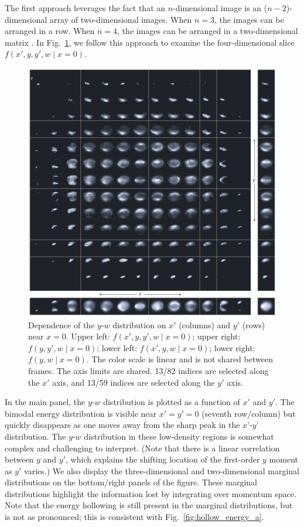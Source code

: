 \documentclass[%
 reprint,
 amsmath,amssymb,
 aps,
prstab,
]{revtex4-2}
\begin{document}
The first approach leverages the fact that an $n$-dimensional image is an ($n-2$)-dimensional array of two-dimensional images. When $n = 3$, the images can be arranged in a row. When $n = 4$, the images can be arranged in a two-dimensional matrix \cite{Ruisard2020}. In Fig.~\ref{fig:matrix_slice_xpyp_view_yw}, we follow this approach to examine the four-dimensional slice $f(x', y, y', w \mid x{=}0)$.
%
\begin{figure}[]
    \centering
    \includegraphics[width=\textwidth]{fig4.pdf}
    \caption{Dependence of the $y$-$w$ distribution on $x'$ (columns) and $y'$ (rows) near $x = 0$. Upper left: $f(x', y, y', w \mid x{=}0)$; upper right: $f(y, y', w \mid x{=}0)$; lower left: $f(x', y, w \mid x{=}0)$; lower right: $f(y, w \mid x{=}0)$. The color scale is linear and is not shared between frames. The axis limits are shared. 13/82 indices are selected along the $x'$ axis, and 13/59 indices are selected along the $y'$ axis.}
    \label{fig:matrix_slice_xpyp_view_yw}
\end{figure}
%
In the main panel, the $y$-$w$ distribution is plotted as a function of $x'$ and $y'$. The bimodal energy distribution is visible near $x'=y'=0$ (seventh row/column) but quickly disappears as one moves away from the sharp peak in the $x’$-$y’$ distribution. The $y$-$w$ distribution in these low-density regions is somewhat complex and challenging to interpret. (Note that there is a linear correlation between $y$ and $y'$, which explains the shifting location of the first-order $y$ moment as $y'$ varies.) We also display the three-dimensional and two-dimensional marginal distributions on the bottom/right panels of the figure. These marginal distributions highlight the information lost by integrating over momentum space. Note that the energy hollowing is still present in the marginal distributions, but is not as pronounced; this is consistent with Fig.~\ref{fig:hollow_energy_a}.
\end{document}
